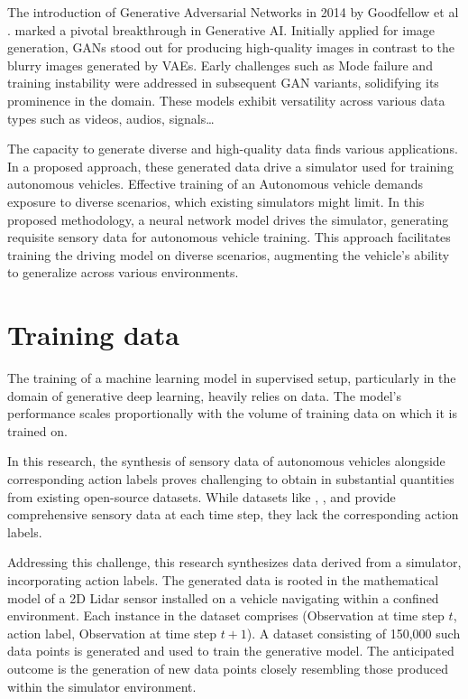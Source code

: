 \documentclass[12pt,twoside,a4paper,parskip]{scrbook} %
\begin{document}
The introduction of Generative Adversarial Networks in 2014 by Goodfellow et al \cite{7_gan}. marked a pivotal breakthrough in Generative AI. Initially applied for image generation, GANs stood out for producing high-quality images in contrast to the blurry images generated by VAEs. Early challenges such as Mode failure and training instability were addressed in subsequent GAN variants, solidifying its prominence in the domain. These models exhibit versatility across various data types such as videos, audios, signals…

The capacity to generate diverse and high-quality data finds various applications. In a proposed approach, these generated data drive a simulator used for training autonomous vehicles. Effective training of an Autonomous vehicle demands exposure to diverse scenarios, which existing simulators might limit. In this proposed methodology, a neural network model drives the simulator, generating requisite sensory data for autonomous vehicle training. This approach facilitates training the driving model on diverse scenarios, augmenting the vehicle's ability to generalize across various environments.

\section{Training data}
The training of a machine learning model in supervised setup, particularly in the domain of generative deep learning, heavily relies on data. The model's performance scales proportionally with the volume of training data on which it is trained on.

In this research, the synthesis of sensory data of autonomous vehicles alongside corresponding action labels proves challenging to obtain in substantial quantities from existing open-source datasets. While datasets like \cite{18_Waymo}, \cite{19_audi}, \cite{20_cityscapes} and \cite{21_panda} provide comprehensive sensory data at each time step, they lack the corresponding action labels.

Addressing this challenge, this research synthesizes data derived from a simulator, incorporating action labels. The generated data is rooted in the mathematical model of a 2D Lidar sensor installed on a vehicle navigating within a confined environment. Each instance in the dataset comprises (Observation at time step \(t\), action label, Observation at time step \(t+1\)). A dataset consisting of 150,000 such data points is generated and used to train the generative model. The anticipated outcome is the generation of new data points closely resembling those produced within the simulator environment.
\end{document}
